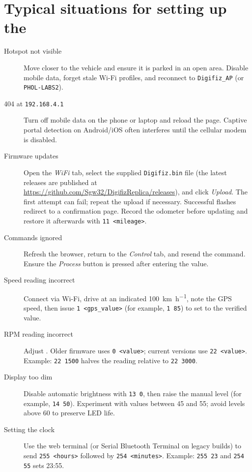 \chapter{Typical situations for setting up the \ReplicaNextLong{}}\label{ch:replica-next-scenarios}

\begin{description}
    \item[Hotspot not visible] Move closer to the vehicle and ensure it is parked in an open area. Disable mobile data, forget stale Wi-Fi profiles, and reconnect to \texttt{Digifiz\_AP} (or \texttt{PHOL-LABS2}).
    \item[404 at \texttt{192.168.4.1}] Turn off mobile data on the phone or laptop and reload the page. Captive portal detection on Android/iOS often interferes until the cellular modem is disabled.
    \item[Firmware updates] Open the \emph{WiFi} tab, select the supplied \texttt{Digifiz.bin} file (the latest releases are published at \url{https://github.com/Sgw32/DigifizReplica/releases}), and click \emph{Upload}. The first attempt can fail; repeat the upload if necessary. Successful flashes redirect to a confirmation page. Record the odometer before updating and restore it afterwards with \verb|11 <mileage>|.
    \item[Commands ignored] Refresh the browser, return to the \emph{Control} tab, and resend the command. Ensure the \emph{Process} button is pressed after entering the value.
    \item[Speed reading incorrect] Connect via Wi-Fi, drive at an indicated \SI{100}{\kilo\metre\per\hour}, note the GPS speed, then issue \verb|1 <gps_value>| (for example, \verb|1 85|) to set  to the verified value.
    \item[RPM reading incorrect] Adjust . Older firmware uses \verb|0 <value>|; current versions use \verb|22 <value>|. Example: \verb|22 1500| halves the reading relative to \verb|22 3000|.
    \item[Display too dim] Disable automatic brightness with \verb|13 0|, then raise the manual level (for example, \verb|14 50|). Experiment with values between 45 and 55; avoid levels above 60 to preserve LED life.
    \item[Setting the clock] Use the web terminal (or Serial Bluetooth Terminal on legacy builds) to send \verb|255 <hours>| followed by \verb|254 <minutes>|. Example: \verb|255 23| and \verb|254 55| sets 23:55.

\end{description}
